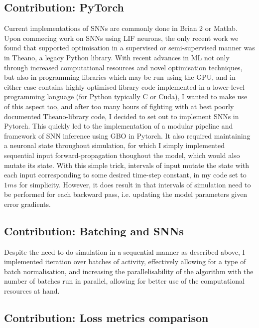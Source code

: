 \documentclass[mphil,deptreport,ai]{infthesis} %
\begin{document}
\subsection{Contribution: PyTorch}

Current implementations of SNNs are commonly done in Brian 2 or Matlab. Upon commecing work on SNNs using LIF neurons, the only recent work we found that supported optimisation in a supervised or semi-supervised manner was in Theano, a legacy Python library.
With recent advances in ML not only through increased computational resources and novel optimisation techniques, but also in programming libraries which may be run using the GPU, and in either case contains highly optimised library code implemented in a lower-level programming language (for Python typically C or Cuda), I wanted to make use of this aspect too, and after too many hours of fighting with at best poorly documented Theano-library code, I decided to set out to implement SNNs in Pytorch.
This quickly led to the implementation of a modular pipeline and framework of SNN inference using GBO in Pytorch.
It also required maintaining a neuronal state throughout simulation, for which I simply implemented sequential input forward-propagation thoughout the model, which would also mutate its state.
With this simple trick, intervals of input mutate the state with each input corresponding to some desired time-step constant, in my code set to $1 ms$ for simplicity. %
However, it does result in that intervals of simulation need to be performed for each backward pass, i.e. updating the model parameters given error gradients.


\subsection{Contribution: Batching and SNNs}

Despite the need to do simulation in a sequential manner as described above, I implemented iteration over batches of activity, effectively allowing for a type of batch normalisation, and increasing the parallelisability of the algorithm with the number of batches run in parallel, allowing for better use of the computational resources at hand.


\subsection{Contribution: Loss metrics comparison}
\end{document}
